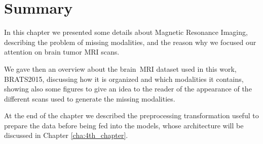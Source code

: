 \section{Summary}
\label{sec:3rd_section_summary}
In this chapter we presented some details about Magnetic Resonance Imaging, describing the problem of missing modalities, and the reason why we focused our attention on brain tumor MRI scans.

We gave then an overview about the brain~\ac{MRI} dataset used in this work, BRATS2015, discussing how it is organized and which modalities it contains, showing also some figures to give an idea to the reader of the appearance of the different scans used to generate the missing modalities. 

At the end of the chapter we described the preprocessing transformation useful to prepare the data before being fed into the models, whose architecture will be discussed in Chapter \ref{cha:4th_chapter}.